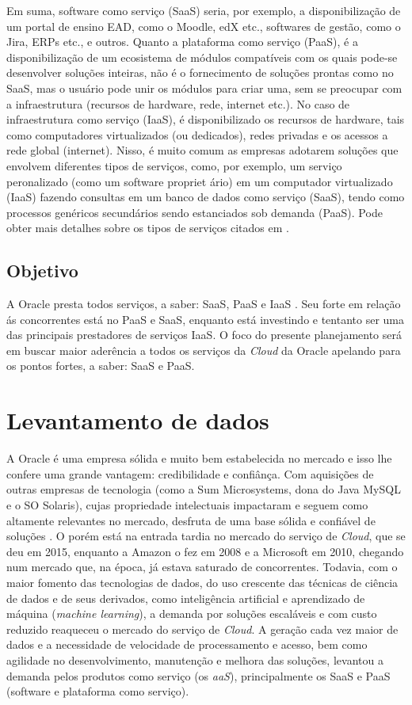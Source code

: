 \documentclass[a4paper]{article}
\begin{document}
Em suma, software como serviço (SaaS) seria, por exemplo, a disponibilização de um portal de ensino EAD, como o Moodle, edX etc., softwares de gestão, como o Jira, ERPs etc., e outros. Quanto a plataforma como serviço (PaaS), é a disponibilização de um ecosistema de módulos compatíveis com os quais pode-se desenvolver soluções inteiras, não é o fornecimento de soluções prontas como no SaaS, mas o usuário pode unir os módulos para criar uma, sem se preocupar com a infraestrutura (recursos de hardware, rede, internet etc.). No caso de infraestrutura como serviço (IaaS), é disponibilizado os recursos de hardware, tais como computadores virtualizados (ou dedicados), redes privadas e os acessos a rede global (internet). Nisso, é muito comum as empresas adotarem soluções que envolvem diferentes tipos de serviços, como, por exemplo, um serviço peronalizado (como um software propriet
ário) em um computador virtualizado (IaaS) fazendo consultas em um banco de dados como serviço (SaaS), tendo como processos genéricos secundários sendo estanciados sob demanda (PaaS). Pode obter mais detalhes sobre os tipos de serviços citados em . 

\subsection{Objetivo}
A Oracle presta todos serviços, a saber: SaaS, PaaS e IaaS \cite{OqueeOra85:online}. Seu forte em relação ás concorrentes está no PaaS e SaaS, enquanto está investindo e tentanto ser uma das principais prestadores de serviços IaaS. O foco do presente planejamento será em buscar maior aderência a todos os serviços da \emph{Cloud} da Oracle apelando para os pontos fortes, a saber: SaaS e PaaS.

\section{Levantamento de dados}

A Oracle é uma empresa sólida e muito bem estabelecida no mercado e isso lhe confere uma grande vantagem: credibilidade e confiânça. Com aquisições de outras empresas de tecnologia (como a Sum Microsystems, dona do Java MySQL e o SO Solaris), cujas propriedade intelectuais impactaram e seguem como altamente relevantes no mercado, desfruta de uma base sólida e confiável de soluções \cite{AlookatO22:online}. O porém está na entrada tardia no mercado do serviço de \emph{Cloud}, que se deu em 2015, enquanto a Amazon o fez em 2008 e a Microsoft em 2010, chegando num mercado que, na 
época, já estava saturado de concorrentes. Todavia, com o maior fomento das tecnologias de dados, do uso crescente das técnicas de ciência de dados e de seus derivados, como inteligência artificial e aprendizado de máquina (\emph{machine learning}), a demanda por soluções escaláveis e com custo reduzido reaqueceu o mercado do serviço de \emph{Cloud}. A geração cada vez maior de dados e a necessidade de velocidade de processamento e acesso, bem como agilidade no desenvolvimento, manutenção e melhora das soluções, levantou a demanda pelos produtos como serviço (os \emph{aaS}), principalmente os SaaS e PaaS (software e plataforma como serviço).
\end{document}
